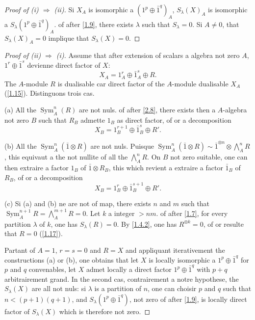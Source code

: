 \documentclass[11pt,a4paper]{article}
\theoremstyle{plain}
\theoremstyle{definition}
\DeclareMathOperator{\Sym}{Sym}
\begin{document}
\begin{proof}[Proof of (i) $\Rightarrow$ (ii)]
Si $X_A$ is isomorphic a $(1^p\oplus\bar{1}^q)_A$, $S_\lambda(X)_A$ is isomorphic a $S_\lambda(1^p\oplus\bar{1}^q)_A$. of after \ref{1.9}, there exists $\lambda$ such that $S_\lambda=0$. Si $A\neq0$, that $S_\lambda(X)_A=0$ implique that $S_\lambda(X)=0$.
\end{proof}

\begin{proof}[Proof of (ii) $\Rightarrow$ (i)]
Assume that after extension of scalars a algebra not zero $A$, $1^r\oplus\bar{1}^s$ devienne direct factor of $X$:
\[
X_A=1_A^r\oplus\bar{1}_A^s\oplus R.
\]
The $A$-module $R$ is dualisable car direct factor of the $A$-module dualisable $X_A$ (\ref{1.15}). Distinguons trois cas.

(a) All the $\Sym^n_A(R)$ are not nuls. of after \ref{2.8}, there exists then a $A$-algebra not zero $B$ such that $R_B$ admette $1_B$ as direct factor, of or a decomposition
\[
X_B=1_B^{r+1}\oplus\bar{1}_B^s\oplus R'.
\]

(b) All the $\Sym^n_A(\bar{1}\otimes R)$ are not nuls. Puisque $\Sym^n_A(\bar{1}\otimes R)\sim\bar{1}^{\otimes n}\otimes\bigwedge^n_A R$, this equivaut a the not nullite of all the $\bigwedge^n_A R$. On $B$ not zero suitable, one can then extraire a factor $1_B$ of $\bar{1}\otimes R_B$, this which revient a extraire a factor $\bar{1}_B$ of $R_B$, of or a decomposition
\[
X_B=1_B^r\oplus\bar{1}_B^{s+1}\oplus R'.
\]

(c) Si (a) and (b) ne are not of map, there exists $n$ and $m$ such that $\Sym^{n+1}_A R=\bigwedge^{m+1}_A R=0$. Let $k$ a integer $>nm$. of after \ref{1.7}, for every partition $\lambda$ of $k$, one has $S_\lambda(R)=0$. By \ref{1.4.2}, one has $R^{\otimes k}=0$, of or resulte that $R=0$ (\ref{1.17}).

Partant of $A=1$, $r=s=0$ and $R=X$ and appliquant iterativement the constructions (a) or (b), one obtains that let $X$ is locally isomorphic a $1^p\oplus\bar{1}^q$ for $p$ and $q$ convenables, let $X$ admet locally a direct factor $1^p\oplus\bar{1}^q$ with $p+q$ arbitrairement grand. In the second cas, contrairement a notre hypothese, the $S_\lambda(X)$ are all not nuls: si $\lambda$ is a partition of $n$, one can choisir $p$ and $q$ such that $n<(p+1)(q+1)$, and $S_\lambda(1^p\oplus\bar{1}^q)$, not zero of after \ref{1.9}, is locally direct factor of $S_\lambda(X)$ which is therefore not zero.
\end{proof}
\end{document}
